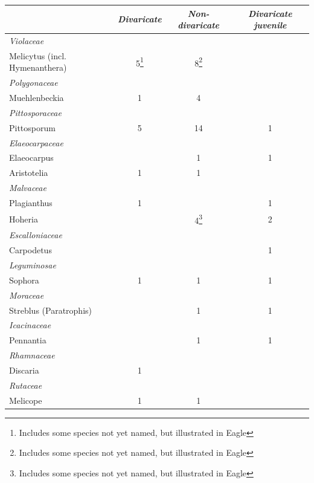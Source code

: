 \begin{xltabular}{\textwidth}{ X c c c }
	\toprule
	& \emph{Divaricate} & \emph{Non-divaricate} & \emph{Divaricate juvenile}\\
	\midrule
	\endhead%
	\emph{Violaceae} \\
	\hspace{3mm}Melicytus (incl. Hymenanthera) & 5\footnote{Includes some species not yet named, but illustrated in Eagle} & 8\footnote{Includes some species not yet named, but illustrated in Eagle} \\
	\emph{Polygonaceae} \\
	\hspace{3mm}Muehlenbeckia & 1 & 4 \\
	\emph{Pittosporaceae} \\
	\hspace{3mm}Pittosporum & 5 & 14 & 1\\
	\emph{Elaeocarpaceae} \\
	\hspace{3mm}Elaeocarpus &  & 1 & 1\\
	\hspace{3mm}Aristotelia & 1 & 1 \\
	\emph{Malvaceae} \\
	\hspace{3mm}Plagianthus & 1 & & 1\\
	\hspace{3mm}Hoheria & & 4\footnote{Includes some species not yet named, but illustrated in Eagle} & 2\\
	\emph{Escalloniaceae} \\
	\hspace{3mm}Carpodetus &  &  & 1\\
	\emph{Leguminosae} \\
	\hspace{3mm}Sophora & 1 & 1 & 1\\
	\emph{Moraceae} \\
	\hspace{3mm}Streblus (Paratrophis) &  & 1 & 1\\
	\emph{Icacinaceae} \\
	\hspace{3mm}Pennantia &  & 1 & 1\\
	\emph{Rhamnaceae} \\
	\hspace{3mm}Discaria & 1 \\
	\emph{Rutaceae} \\
	\hspace{3mm}Melicope & 1 & 1 \\

\end{xltabular}
